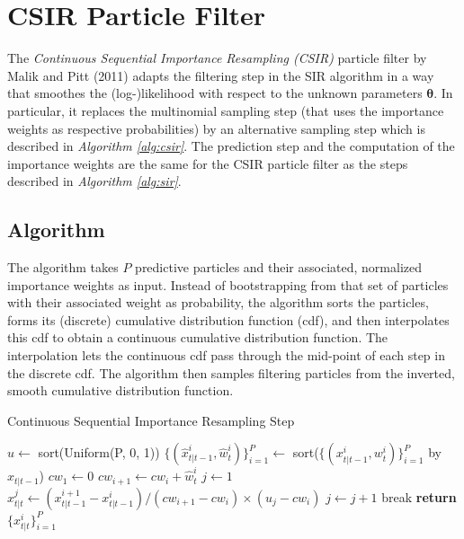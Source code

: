 \documentclass[11pt, oneside]{scrreprt}   	%
\begin{document}
\section{CSIR Particle Filter}
The \textit{Continuous Sequential Importance Resampling (CSIR)} particle filter by Malik and Pitt (2011) adapts the filtering step in the SIR algorithm in a way that smoothes the (log-)likelihood with respect to the unknown parameters $\boldsymbol{\theta}$. In particular, it replaces the multinomial sampling step (that uses the importance weights as respective probabilities) by an alternative sampling step which is described in \textit{Algorithm \ref{alg:csir}}. The prediction step and the computation of the importance weights are the same for the CSIR particle filter as the steps described in \textit{Algorithm \ref{alg:sir}}. 

\subsection{Algorithm}
The algorithm takes $P$ predictive particles and their associated, normalized importance weights as input. Instead of bootstrapping from that set of particles with their associated weight as probability, the algorithm sorts the particles, forms its (discrete) cumulative distribution function (cdf), and then interpolates this cdf to obtain a continuous cumulative distribution function. The interpolation lets the continuous cdf pass through the mid-point of each step in the discrete cdf. The algorithm then samples filtering particles from the inverted, smooth cumulative distribution function.\\

\begin{algorithm}[h!]
\caption{Continuous Sequential Importance Resampling Step}
\label{alg:csir}
\begin{algorithmic}[1]
      	\smallskip
	\State $u \gets$ sort(Uniform(P, 0, 1))
	\smallskip
	\State $\{(\hat{x}_{t | t - 1}^i, \hat{w}_t^i)\}_{i=1}^P \gets$ sort($\{(x_{t | t - 1}^i, w_t^i)\}_{i=1}^P$ by $x_{t | t - 1}$)
	\smallskip
	\State $cw_1 \gets 0$
		\State $cw_{i+1} \gets cw_{i} +  \hat{w}_t^i$ 
	\EndFor	
      	\smallskip
	\State $j \gets 1$
	 
			\State $x_{t | t}^j \gets (x_{t | t - 1}^{i+1} - x_{t | t-1}^i) / (cw_{i+1} - cw_i) \times (u_j - cw_i)$
			\smallskip
				\State $j \gets j + 1$ 
			\Else 
				\State break 
			\EndIf
		\EndWhile 
	\EndFor		
	\smallskip
      \State \textbf{return} $\{x_{t | t}^i\}_{i=1}^P$
    \EndProcedure
  \end{algorithmic}
\end{algorithm}
\end{document}
